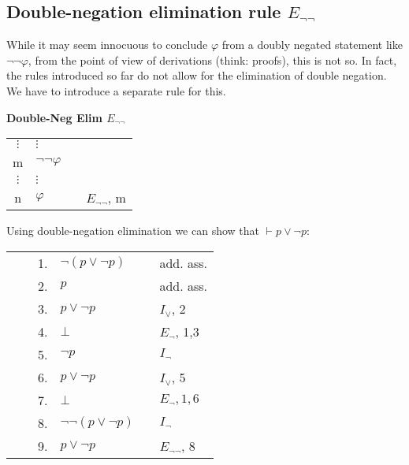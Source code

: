 \documentclass[nobib,nofonts]{tufte-handout}
\begin{document}
\subsection{Double-negation elimination rule $E_{\neg\neg}$}

While it may seem innocuous to conclude $\varphi$ from a doubly negated statement like $\neg\neg\varphi$, from the point of view of derivations (think: proofs), this is not so.
In fact, the rules introduced so far do not allow for the elimination of double negation.
We have to introduce a separate rule for this.

\bigskip
\noindent \colorbox{mygray!60}{\centering
  \begin{minipage}[t]{0.35\linewidth}
    \textbf{Double-Neg Elim $E_{\neg\neg}$}
  \end{minipage}
  \begin{minipage}[t]{0.55\linewidth}
    \begin{tabular}{clcl}
            $\vdots$ & $\vdots$  & \\
      m              & $\neg \neg \varphi$ &  \\
            $\vdots$ & $\vdots$  & \\
      n              & $\varphi$    & & $E_{\neg \neg}$, m
    \end{tabular}
  \end{minipage}
}
\bigskip

Using double-negation elimination we can show that $\vdash p \vee \neg p$:

\begin{tabular}{ccclcl}
 \cline{1-3}\vline  &         & 1. & $\neg (p \vee \neg p)$      & & add. ass.  \\
 \vline             &         & 2. & $p$                         & & add. ass.  \\
 \cline{2-3} \vline &  \vline & 3. & $p \vee \neg p$             & & $I_{\vee}$, 2  \\
 \vline             &  \vline & 4. & $\bot$                      & & $E_{\neg}$, 1,3 \\
 \cline{2-6} \vline &         & 5. & $\neg p$                    & & $I_{\neg}$\\
 \vline             &         & 6. & $p \vee \neg p $            & & $I_{\vee}$, 5 \\
 \vline             &         & 7. & $\bot$                      & & $E_{\neg}, 1, 6$  \\ \hline
                    &         & 8. & $\neg \neg (p \vee \neg p)$ & & $I_{\neg}$\\
                    &         & 9. & $p \vee \neg p$             & & $E_{\neg\neg}$, 8 \\
\end{tabular}
\end{document}

